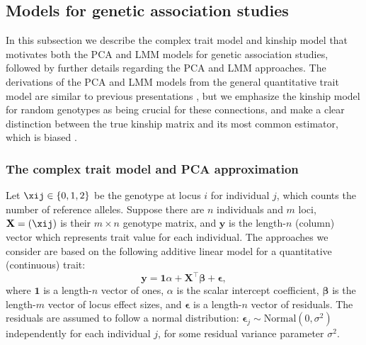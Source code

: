 \documentclass[11pt]{article}
\begin{document}
\subsection{Models for genetic association studies}

In this subsection we describe the complex trait model and kinship model that motivates both the PCA and LMM models for genetic association studies, followed by further details regarding the PCA and LMM approaches.
The derivations of the PCA and LMM models from the general quantitative trait model are similar to previous presentations \citep{astle_population_2009, janss_inferences_2012, hoffman_correcting_2013}, but we emphasize the kinship model for random genotypes as being crucial for these connections, and make a clear distinction between the true kinship matrix and its most common estimator, which is biased \citep{ochoa_fst2, ochoa_human}.

\subsubsection{The complex trait model and PCA approximation}

Let $\xij \in \{ 0, 1, 2 \}$ be the genotype at locus $i$ for individual $j$, which counts the number of reference alleles.
Suppose there are $n$ individuals and $m$ loci,
$\mathbf{X} = ( \xij )$ is their $m \times n$ genotype matrix, and
$\mathbf{y}$ is the length-$n$ (column) vector which represents trait value for each individual.
The approaches we consider are based on the following additive linear model for a quantitative (continuous) trait:
\begin{equation}
  \label{eq:trait}
  \mathbf{y}
  =
  \mathbf{1} \alpha + \mathbf{X}^\intercal \mathbf{\beta} + \mathbf{\epsilon}
  ,
\end{equation}
where
$\mathbf{1}$ is a length-$n$ vector of ones,
$\alpha$ is the scalar intercept coefficient,
$\mathbf{\beta}$ is the length-$m$ vector of locus effect sizes, and
$\mathbf{\epsilon}$ is a length-$n$ vector of residuals.
The residuals are assumed to follow a normal distribution: $\mathbf{\epsilon}_j \sim \text{Normal}(0, \sigma^2)$ independently for each individual $j$, for some residual variance parameter $\sigma^2$.
\end{document}
